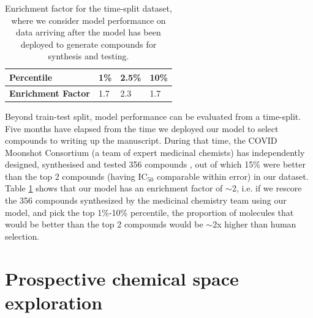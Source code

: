 
\begin{table}
    \centering
    \begin{tabular}{|l|l|l|l|}
    \hline
    \textbf{Percentile}        & 1\% & 2.5\% & 10\% \\ \hline
    \textbf{Enrichment Factor} & 1.7 & 2.3   & 1.7  \\ \hline
    \end{tabular}
    \caption{Enrichment factor for the time-split dataset, where we consider model performance on data arriving after the model has been deployed to generate compounds for synthesis and testing. }
    \label{table:time_split}
\end{table}

Beyond train-test split, model performance can be evaluated from a time-split. Five months have elapsed from the time we deployed our model to select compounds to writing up the manuscript. During that time, the COVID Moonshot Consortium (a team of expert medicinal chemists) has independently designed, synthesised and tested 356 compounds \cite{moonshot2020covid}, out of which 15\% were better than the top 2 compounds (having $\mathrm{IC}_{50}$ comparable within error) in our dataset. Table \ref{table:time_split} shows that our model has an enrichment factor of $\sim$2, i.e. if we rescore the 356 compounds synthesized by the medicinal chemistry team using our model, and pick the top 1\%-10\% percentile, the proportion of molecules that would be better than the top 2 compounds would be $\sim$2x higher than human selection. 



\section{Prospective chemical space exploration}

